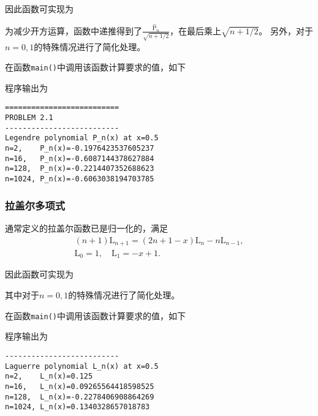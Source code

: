 \documentclass[a4paper,unicode]{report}
\newcommand{\chapterendname}{章}
\begin{document}
因此函数可实现为
{
    \linespread{1.0}
    
    
}

为减少开方运算，函数中递推得到了$\frac{\hat{\mathrm{P}}_{n}}{\sqrt{n+1/2}}$，在最后乘上$\sqrt{n+1/2}$。
另外，对于$n=0, 1$的特殊情况进行了简化处理。

在函数\texttt{main()}中调用该函数计算要求的值，如下
{
    \linespread{1.0}
    
}
程序输出为
\begin{verbatim}
==========================
PROBLEM 2.1
--------------------------
Legendre polynomial P_n(x) at x=0.5
n=2,    P_n(x)=-0.1976423537605237
n=16,   P_n(x)=-0.6087144378627884
n=128,  P_n(x)=-0.2214407352688623
n=1024, P_n(x)=-0.6063038194703785
\end{verbatim}


\subsubsection{拉盖尔多项式}
通常定义的拉盖尔函数已是归一化的，满足
\begin{gather}
    (n+1)\mathrm{L}_{n+1}=(2n+1-x)\mathrm{L}_{n}-n\mathrm{L}_{n-1},\\
    \mathrm{L}_0 = 1,\quad \mathrm{L}_1 = -x+1.
\end{gather}

因此函数可实现为
{
    \linespread{1.0}
    
    
}

其中对于$n=0, 1$的特殊情况进行了简化处理。

在函数\texttt{main()}中调用该函数计算要求的值，如下
{
    \linespread{1.0}
    
}
程序输出为
\begin{verbatim}
--------------------------
Laguerre polynomial L_n(x) at x=0.5
n=2,    L_n(x)=0.125
n=16,   L_n(x)=0.09265564418598525
n=128,  L_n(x)=-0.2278406908864269
n=1024, L_n(x)=0.1340328657018783
\end{verbatim}
\end{document}
